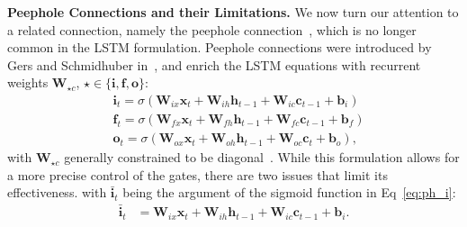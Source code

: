 \smallbreak
\noindent\textbf{Peephole Connections and their Limitations.}
We now turn our attention to a related connection, namely the peephole connection~\citep{gers2000recurrent}, which is no longer common in the LSTM formulation.
%
Peephole connections were introduced by Gers and Schmidhuber in~\citep{gers2000recurrent}, and enrich the LSTM equations with recurrent weights $\mathbf{W}_{\star c}$, $\star \in \{\mathbf{i}, \mathbf{f}, \mathbf{o}\}$:
\begin{align}
    &\mathbf{i}_t = \sigma
                    (\mathbf{W}_{ix}\mathbf{x}_{t} +
                    \mathbf{W}_{ih} \mathbf{h}_{t-1} +
                    \mathbf{W}_{ic} \mathbf{c}_{t-1} +
                    \mathbf{b}_i)
                    \label{eq:ph_i} \\
    &\mathbf{f}_t = \sigma
                    (\mathbf{W}_{fx}\mathbf{x}_{t} +
                    \mathbf{W}_{fh} \mathbf{h}_{t-1} +
                    \mathbf{W}_{fc} \mathbf{c}_{t-1} +
                    \mathbf{b}_f) \\
    &\mathbf{o}_t = \sigma
                    (\mathbf{W}_{ox}\mathbf{x}_{t} +
                    \mathbf{W}_{oh} \mathbf{h}_{t-1} +
                    \mathbf{W}_{oc} \mathbf{c}_{t} +
                    \mathbf{b}_o),
\end{align}
with $\mathbf{W}_{\star c}$ generally constrained to be diagonal~\citep{graves2013generating, Greff2017LSTMAS}. While this formulation allows for a more precise control of the gates, there are two issues that limit its effectiveness.
with $\mathbf{\bar i}_t$ being the argument of the sigmoid function in Eq~\ref{eq:ph_i}:
\begin{align}
    \mathbf{\bar i}_t &= \mathbf{W}_{ix}\mathbf{x}_{t} +
                                     \mathbf{W}_{ih} \mathbf{h}_{t-1} +
                                     \mathbf{W}_{ic} \mathbf{c}_{t-1} +
                                     \mathbf{b}_i .
\end{align}
